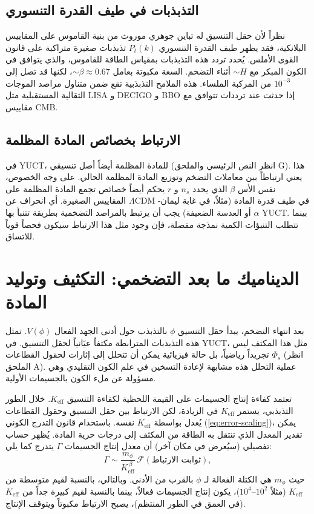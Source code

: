 \documentclass[11pt,a4paper]{article}
\theoremstyle{remark}
\newcommand{\Keff}{K_{\mathrm{eff}}}
\begin{document}
	\subsection{التذبذبات في طيف القدرة التنسوري}
	
	نظراً لأن حقل التنسيق له تباين جوهري موروث من بنية القاموس على المقاييس البلانكية، فقد يظهر طيف القدرة التنسوري $P_t(k)$ تذبذبات صغيرة متراكبة على قانون القوى الأملس. يُحدد تردد هذه التذبذبات بمقياس الطاقة للقاموس، والذي يتوافق في الكون المبكر مع $\sim H$ أثناء التضخم. السعة مكبوتة بعامل $\sim \beta \approx 0.67$، لكنها قد تصل إلى $10^{-3}$ من المركبة الملساء. هذه الملامح التذبذبية تقع ضمن متناول مراصد الموجات الثقالية المستقبلية مثل LISA و DECIGO و BBO إذا حدثت عند ترددات تتوافق مع مقاييس CMB.
	
	\subsection{الارتباط بخصائص المادة المظلمة}
	
	في YUCT، للمادة المظلمة أيضاً أصل تنسيقي (انظر النص الرئيسي والملحق G). هذا يعني ارتباطاً بين معاملات التضخم وتوزيع المادة المظلمة الحالي. على وجه الخصوص، نفس الأس $\beta$ الذي يحدد $n_s$ و $r$ يحكم أيضاً خصائص تجمع المادة المظلمة على المقاييس الصغيرة. أي انحراف عن $\Lambda$CDM في طيف قدرة المادة (مثلاً، في غابة ليمان-$\alpha$ أو العدسة الضعيفة) يجب أن يرتبط بالمراصد التضخمية بطريقة تتنبأ بها YUCT. بينما تتطلب التنبؤات الكمية نمذجة مفصلة، فإن وجود مثل هذا الارتباط سيكون فحصاً قوياً للاتساق.
	
	\section{الديناميك ما بعد التضخمي: التكثيف وتوليد المادة}
	\label{sec:postinflation}
	
	بعد انتهاء التضخم، يبدأ حقل التنسيق $\phi$ بالتذبذب حول أدنى الجهد الفعال $V(\phi)$. تمثل هذه التذبذبات المترابطة مكثفاً عيَانياً لحقل التنسيق. في YUCT، مثل هذا المكثف ليس تجريداً رياضياً، بل حالة فيزيائية يمكن أن تتحلل إلى إثارات لحقول القطاعات $\Phi_s$ (انظر الملحق A). عملية التحلل هذه مشابهة لإعادة التسخين في علم الكون التقليدي وهي مسؤولة عن ملء الكون بالجسيمات الأولية.
	
	تعتمد كفاءة إنتاج الجسيمات على القيمة اللحظية لكفاءة التنسيق $\Keff$. خلال الطور التذبذبي، يستمر $\Keff$ في الزيادة، لكن الارتباط بين حقل التنسيق وحقول القطاعات يُعدل بواسطة $\Keff$ نفسه. باستخدام قانون التدرج الكوني (\ref{eq:error-scaling})، يمكن تقدير المعدل الذي تنتقل به الطاقة من المكثف إلى درجات حرية المادة. يُظهر حساب تفصيلي (سيُعرض في مكان آخر) أن معدل إنتاج الجسيمات $\Gamma$ يتدرج كما يلي:
	\begin{equation}
		\Gamma \sim \frac{m_\phi}{\Keff^{\,\beta}} \, \mathcal{F}(\text{ثوابت الارتباط}),
		\label{eq:gamma}
	\end{equation}
	حيث $m_\phi$ هي الكتلة الفعالة لـ $\phi$ بالقرب من الأدنى. وبالتالي، بالنسبة لقيم متوسطة من $\Keff$ (مثلاً $10^2$–$10^4$)، يكون إنتاج الجسيمات فعالاً، بينما بالنسبة لقيم كبيرة جداً من $\Keff$ (في العمق في الطور المنتظم)، يصبح الارتباط مكبوتاً ويتوقف الإنتاج.
	
\end{document}
